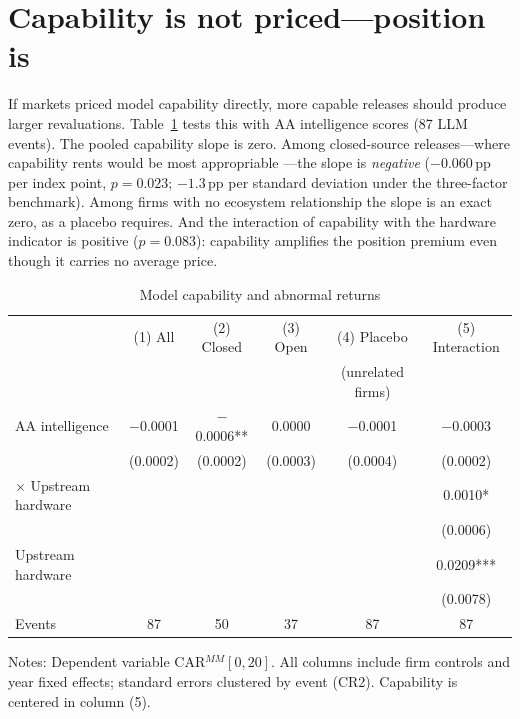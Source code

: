 \documentclass[review,12pt,authoryear]{elsarticle}
\newcommand{\pp}{\,pp}
\begin{document}
\section{Capability is not priced---position is}\label{sec:capability}

If markets priced model capability directly, more capable releases should
produce larger revaluations. Table~\ref{tab:capability} tests this with AA
intelligence scores (87 LLM events). The pooled capability slope is zero.
Among closed-source releases---where capability rents would be most
appropriable \citep{teece1986}---the slope is \emph{negative}
($-0.060$\pp{} per index point, $p=0.023$; $-1.3$\pp{} per standard deviation
under the three-factor benchmark). Among firms with no ecosystem relationship
the slope is an exact zero, as a placebo requires. And the interaction of
capability with the hardware indicator is positive ($p=0.083$): capability
amplifies the position premium even though it carries no average price.

\begin{table}[t!]
\centering
\begin{threeparttable}
\caption{Model capability and abnormal returns}\label{tab:capability}
\small
\begin{tabular}{lccccc}
\toprule
 & (1) All & (2) Closed & (3) Open & (4) Placebo & (5) Interaction \\
 &  &  &  & (unrelated firms) &  \\
\midrule
AA intelligence     & $-$0.0001 & $-$0.0006** & 0.0000 & $-$0.0001 & $-$0.0003 \\
                    & (0.0002) & (0.0002) & (0.0003) & (0.0004) & (0.0002) \\
$\times$ Upstream hardware & & & & & 0.0010* \\
                    & & & & & (0.0006) \\
Upstream hardware   & & & & & 0.0209*** \\
                    & & & & & (0.0078) \\
\midrule
Events              & 87 & 50 & 37 & 87 & 87 \\
\bottomrule
\end{tabular}
\begin{tablenotes}\footnotesize
\item Notes: Dependent variable CAR$^{MM}[0,20]$. All columns include firm
controls and year fixed effects; standard errors clustered by event (CR2).
Capability is centered in column (5).
\end{tablenotes}
\end{threeparttable}
\end{table}
\end{document}
